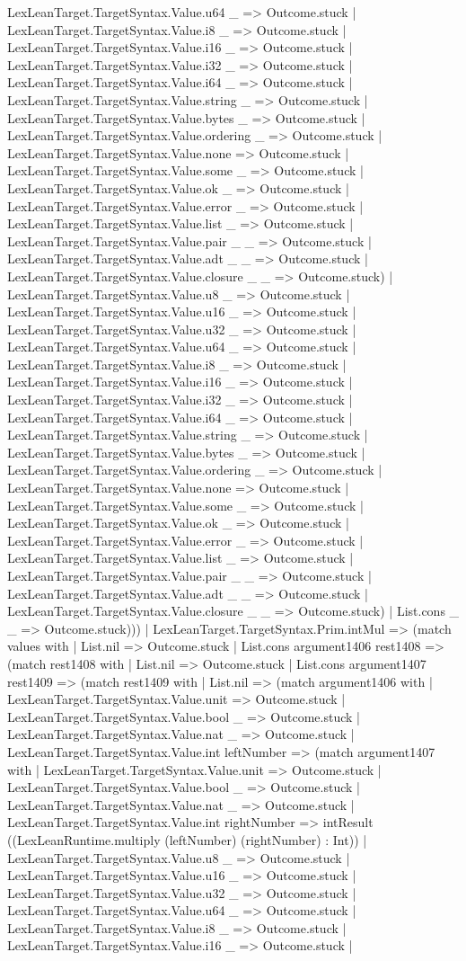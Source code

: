 \documentclass[11pt]{article}
\begin{document}
LexLeanTarget.TargetSyntax.Value.u64 \_ => Outcome.stuck | LexLeanTarget.TargetSyntax.Value.i8 \_ => Outcome.stuck | LexLeanTarget.TargetSyntax.Value.i16 \_ => Outcome.stuck | LexLeanTarget.TargetSyntax.Value.i32 \_ => Outcome.stuck | LexLeanTarget.TargetSyntax.Value.i64 \_ => Outcome.stuck | LexLeanTarget.TargetSyntax.Value.string \_ => Outcome.stuck | LexLeanTarget.TargetSyntax.Value.bytes \_ => Outcome.stuck | LexLeanTarget.TargetSyntax.Value.ordering \_ => Outcome.stuck | LexLeanTarget.TargetSyntax.Value.none => Outcome.stuck | LexLeanTarget.TargetSyntax.Value.some \_ => Outcome.stuck | LexLeanTarget.TargetSyntax.Value.ok \_ => Outcome.stuck | LexLeanTarget.TargetSyntax.Value.error \_ => Outcome.stuck | LexLeanTarget.TargetSyntax.Value.list \_ => Outcome.stuck | LexLeanTarget.TargetSyntax.Value.pair \_ \_ => Outcome.stuck | LexLeanTarget.TargetSyntax.Value.adt \_ \_ => Outcome.stuck | LexLeanTarget.TargetSyntax.Value.closure \_ \_ => Outcome.stuck) | LexLeanTarget.TargetSyntax.Value.u8 \_ => Outcome.stuck | LexLeanTarget.TargetSyntax.Value.u16 \_ => Outcome.stuck | LexLeanTarget.TargetSyntax.Value.u32 \_ => Outcome.stuck | LexLeanTarget.TargetSyntax.Value.u64 \_ => Outcome.stuck | LexLeanTarget.TargetSyntax.Value.i8 \_ => Outcome.stuck | LexLeanTarget.TargetSyntax.Value.i16 \_ => Outcome.stuck | LexLeanTarget.TargetSyntax.Value.i32 \_ => Outcome.stuck | LexLeanTarget.TargetSyntax.Value.i64 \_ => Outcome.stuck | LexLeanTarget.TargetSyntax.Value.string \_ => Outcome.stuck | LexLeanTarget.TargetSyntax.Value.bytes \_ => Outcome.stuck | LexLeanTarget.TargetSyntax.Value.ordering \_ => Outcome.stuck | LexLeanTarget.TargetSyntax.Value.none => Outcome.stuck | LexLeanTarget.TargetSyntax.Value.some \_ => Outcome.stuck | LexLeanTarget.TargetSyntax.Value.ok \_ => Outcome.stuck | LexLeanTarget.TargetSyntax.Value.error \_ => Outcome.stuck | LexLeanTarget.TargetSyntax.Value.list \_ => Outcome.stuck | LexLeanTarget.TargetSyntax.Value.pair \_ \_ => Outcome.stuck | LexLeanTarget.TargetSyntax.Value.adt \_ \_ => Outcome.stuck | LexLeanTarget.TargetSyntax.Value.closure \_ \_ => Outcome.stuck) | List.cons \_ \_ => Outcome.stuck))) | LexLeanTarget.TargetSyntax.Prim.intMul => (match values with | List.nil => Outcome.stuck | List.cons argument1406 rest1408 => (match rest1408 with | List.nil => Outcome.stuck | List.cons argument1407 rest1409 => (match rest1409 with | List.nil => (match argument1406 with | LexLeanTarget.TargetSyntax.Value.unit => Outcome.stuck | LexLeanTarget.TargetSyntax.Value.bool \_ => Outcome.stuck | LexLeanTarget.TargetSyntax.Value.nat \_ => Outcome.stuck | LexLeanTarget.TargetSyntax.Value.int leftNumber => (match argument1407 with | LexLeanTarget.TargetSyntax.Value.unit => Outcome.stuck | LexLeanTarget.TargetSyntax.Value.bool \_ => Outcome.stuck | LexLeanTarget.TargetSyntax.Value.nat \_ => Outcome.stuck | LexLeanTarget.TargetSyntax.Value.int rightNumber => intResult ((LexLeanRuntime.multiply (leftNumber) (rightNumber) : Int)) | LexLeanTarget.TargetSyntax.Value.u8 \_ => Outcome.stuck | LexLeanTarget.TargetSyntax.Value.u16 \_ => Outcome.stuck | LexLeanTarget.TargetSyntax.Value.u32 \_ => Outcome.stuck | LexLeanTarget.TargetSyntax.Value.u64 \_ => Outcome.stuck | LexLeanTarget.TargetSyntax.Value.i8 \_ => Outcome.stuck | LexLeanTarget.TargetSyntax.Value.i16 \_ => Outcome.stuck | 
\end{document}
